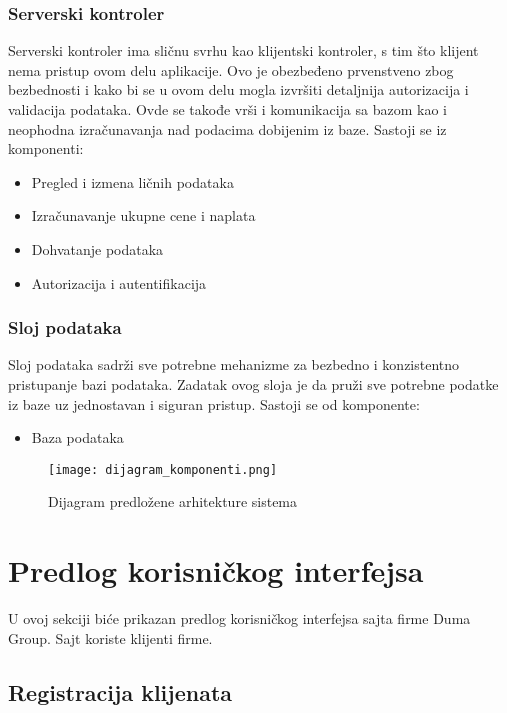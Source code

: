 \documentclass[a4paper]{article}
\begin{document}
\subsubsection{Serverski kontroler}

Serverski kontroler ima sličnu svrhu kao klijentski kontroler, s tim što klijent nema pristup ovom delu aplikacije. Ovo je obezbeđeno prvenstveno zbog bezbednosti i kako bi se u ovom delu mogla izvršiti detaljnija autorizacija i validacija podataka. Ovde se takođe vrši i komunikacija sa bazom kao i neophodna izračunavanja nad podacima dobijenim iz baze. 
\newline
Sastoji se iz komponenti:
\begin{itemize}
\item Pregled i izmena ličnih podataka
\item Izračunavanje ukupne cene i naplata
\item Dohvatanje podataka
\item Autorizacija i autentifikacija
\end{itemize}


\subsubsection{Sloj podataka}
Sloj podataka sadrži sve potrebne mehanizme za bezbedno i konzistentno pristupanje bazi podataka. Zadatak ovog sloja je da pruži sve potrebne podatke iz baze uz jednostavan i siguran  pristup.\newline
Sastoji se od komponente:
\begin{itemize}
    \item Baza podataka
\end{itemize}

\begin{figure}[H]
    \centering
    \texttt{[image: dijagram\_komponenti.png]}
    \caption{Dijagram predložene arhitekture sistema}
    \label{fig:dijagramTabela}
\end{figure}

\section{Predlog korisničkog interfejsa}

U ovoj sekciji biće prikazan predlog korisničkog interfejsa sajta firme Duma Group. Sajt koriste klijenti firme.

\subsection{Registracija klijenata}
\end{document}
